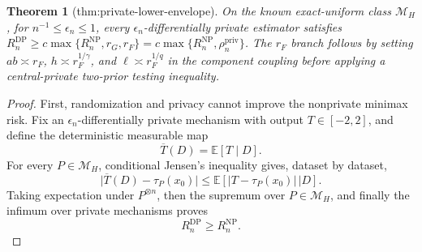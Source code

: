 \documentclass{article}
\newtheorem{theorem}{Theorem}
\begin{document}
\begin{theorem}[thm:private-lower-envelope]\label{thm:private-lower-envelope}
On the known exact-uniform class \(\mathcal M_H\), for \(n^{-1}\le\epsilon_n\le1\), every \(\epsilon_n\)-differentially private estimator satisfies \(R_n^{\mathrm{DP}}\ge c\max\{R_n^{\mathrm{NP}},r_G,r_F\}=c\max\{R_n^{\mathrm{NP}},\rho_n^{\mathrm{priv}}\}\). The \(r_F\) branch follows by setting \(ab\asymp r_F\), \(h\asymp r_F^{1/\gamma}\), and \(\ell\asymp r_F^{1/q}\) in the component coupling before applying a central-private two-prior testing inequality.
\end{theorem}
\begin{proof}
First, randomization and privacy cannot improve the nonprivate minimax risk.  Fix an \(\epsilon_n\)-differentially private mechanism with output \(T\in[-2,2]\), and define the deterministic measurable map
\[
 \overline T(D)=\mathbb E[T\mid D].
\]
For every \(P\in\mathcal M_H\), conditional Jensen's inequality gives, dataset by dataset,
\[
 \bigl|\overline T(D)-\tau_P(x_0)\bigr|
 \le \mathbb E\!\left[\left.|T-\tau_P(x_0)|\,\right|D\right].                 \tag{16}
\]
Taking expectation under \(P^{\otimes n}\), then the supremum over \(P\in\mathcal M_H\), and finally the infimum over private mechanisms proves
\[
 R_n^{\mathrm{DP}}\ge R_n^{\mathrm{NP}}.                                      \tag{17}
\]


\end{proof}
\end{document}
